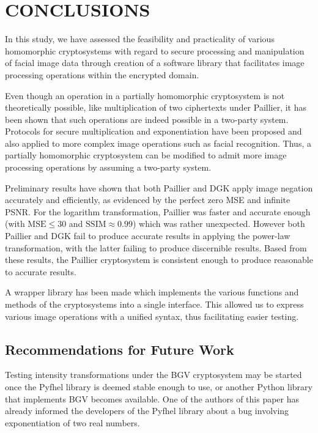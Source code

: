 \chapter{CONCLUSIONS}
In this study, we have assessed the feasibility and practicality of various homomorphic cryptosystems with regard to secure processing and manipulation of facial image data through creation of a software library that facilitates image processing operations within the encrypted domain.

Even though an operation in a partially homomorphic cryptosystem is not theoretically possible, like multiplication of two ciphertexts under Paillier, it has been shown that such operations are indeed possible in a two-party system. Protocols for secure multiplication and exponentiation have been proposed and also applied to more complex image operations such as facial recognition. Thus, a partially homomorphic cryptosystem can be modified to admit more image processing operations by assuming a two-party system.

Preliminary results have shown that both Paillier and DGK apply image negation accurately and efficiently, as evidenced by the perfect zero MSE and infinite PSNR. For the logarithm transformation, Paillier was faster and accurate enough (with $\text{MSE} \le 30$ and $\text{SSIM} \approx 0.99$) which was rather unexpected. However both Paillier and DGK fail to produce accurate results in applying the power-law transformation, with the latter failing to produce discernible results. Based from these results, the Paillier cryptosystem is consistent enough to produce reasonable to accurate results.

A wrapper library has been made which implements the various functions and methods of the cryptosystems into a single interface. This allowed us to express various image operations with a unified syntax, thus facilitating easier testing.

\section{Recommendations for Future Work}
Testing intensity transformations under the BGV cryptosystem may be started once the Pyfhel library is deemed stable enough to use, or another Python library that implements BGV becomes available.
One of the authors of this paper has already informed the developers of the Pyfhel library about a bug involving exponentiation of two real numbers.


